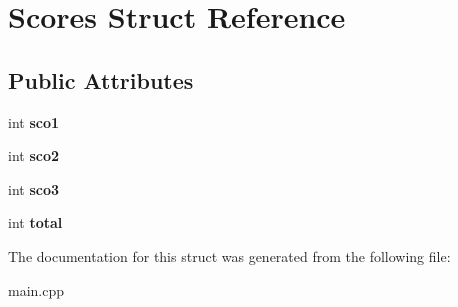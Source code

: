 \hypertarget{struct_scores}{}\section{Scores Struct Reference}
\label{struct_scores}
\subsection*{Public Attributes}
\begin{DoxyCompactItemize}
\item 
\mbox{\label{struct_scores_acc09516a3308482d70aed7a93f9f85c2}} 
int {\bfseries sco1}
\item 
\mbox{\label{struct_scores_a2330b4a2828c2e76019b60b8e68297ad}} 
int {\bfseries sco2}
\item 
\mbox{\label{struct_scores_a5d4398bd7b6769fc5464ec3aa4bafca8}} 
int {\bfseries sco3}
\item 
\mbox{\label{struct_scores_aeea4c46b2bacf87bf0ec578cd2eb2b78}} 
int {\bfseries total}
\end{DoxyCompactItemize}


The documentation for this struct was generated from the following file\+:\begin{DoxyCompactItemize}
\item 
main.\+cpp\end{DoxyCompactItemize}
